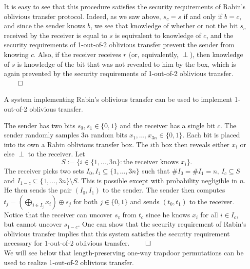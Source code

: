 \documentclass[12pt]{tufte-book}
\begin{document}
It is easy to see that this procedure satisfies the security requirements of Rabin's oblivious transfer protocol. Indeed, as we saw above, $s_c = s$ if and only if $b = c$, and since the sender knows $b$, we see that knowledge of whether or not the bit $s_c$ received by the receiver is equal to $s$ is equivalent to knowledge of $c$, and the security requirements of 1-out-of-2 oblivious transfer prevent the sender from knowing $c$. Also, if the receiver receives $r$ (or, equivalently, $\perp$), then knowledge of $s$ is knowledge of the bit that was not revealed to him by the box, which is again prevented by the security requirements of 1-out-of-2 oblivious transfer.  $\qed$

\begin{lemma}
A system implementing Rabin's oblivious transfer can be used to implement 1-out-of-2 oblivious transfer.
\end{lemma}

\proofsketch
The sender has two bits $s_0, s_1 \in \{0,1\}$ and the receiver has a single bit $c$. The sender randomly samples $3n$ random bits $x_1, \dotsc, x_{3n} \in \{0,1\}$. Each bit is placed into its own a Rabin oblivious transfer box. The $i$th box then reveals either $x_i$ or else $\perp$ to the receiver. Let 
\[ S := \{i \in \{1, \dotsc, 3n\} : \text{the receiver knows } x_i\}. \]
The receiver picks two sets $I_0, I_1 \subseteq \{1, \dotsc, 3n\}$ such that $\# I_0 = \# I_1 = n$, $I_c \subseteq S$ and $I_{1-c} \subseteq \{1, \dotsc, 3n\} \setminus S$. This is possible except with probability negligible in $n$. He then sends the pair $(I_0, I_1)$ to the sender. The sender then computes $t_j= \left(\bigoplus_{i \in I_j}x_i \right) \oplus s_j$ for both $j \in \{0,1\}$ and sends $(t_0, t_1)$ to the receiver. \\

Notice that the receiver can uncover $s_c$ from $t_c$ since he knows $x_i$ for all $i \in I_c$, but cannot uncover $s_{1-c}$. One can show that the security requirement of Rabin's oblivious transfer implies that this system satisfies the security requirement necessary for 1-out-of-2 oblivious transfer. $\qed$ \\

We will see below that length-preserving one-way trapdoor permutations can be used to realize 1-out-of-2 oblivious transfer. 
\end{document}
